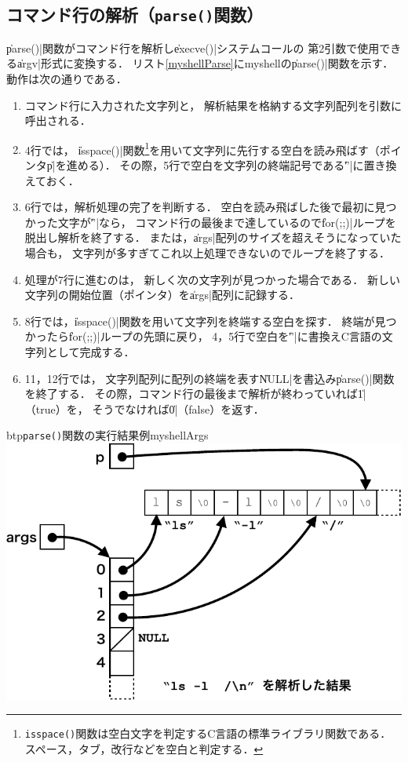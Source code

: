 \subsection{コマンド行の解析（\texttt{parse()}関数）}
\|parse()|関数がコマンド行を解析し\|execve()|システムコールの
第2引数で使用できる\|argv|形式に変換する．
リスト\ref{myshellParse}にmyshellの\|parse()|関数を示す．
動作は次の通りである．



\begin{enumerate}
\item コマンド行に入力された文字列と，
  解析結果を格納する文字列配列を引数に呼出される．
\item 4行では，
  \|isspace()|関数\footnote{
    \texttt{isspace()}関数は空白文字を判定するC言語の標準ライブラリ関数である．
    スペース，タブ，改行などを空白と判定する．
  }を用いて文字列に先行する空白を読み飛ばす（ポインタ\|p|を進める）．
  その際，5行で空白を文字列の終端記号である\|'\0'|に置き換えておく．
\item 6行では，解析処理の完了を判断する．
  空白を読み飛ばした後で最初に見つかった文字が\|'\0'|なら，
  コマンド行の最後まで達しているので\|for(;;)|ループを脱出し解析を終了する．
  または，\|args|配列のサイズを超えそうになっていた場合も，
  文字列が多すぎてこれ以上処理できないのでループを終了する．
\item 処理が7行に進むのは，
  新しく次の文字列が見つかった場合である．
  新しい文字列の開始位置（ポインタ）を\|args|配列に記録する．
\item 8行では，\|isspace()|関数を用いて文字列を終端する空白を探す．
  終端が見つかったら\|for(;;)|ループの先頭に戻り，
  4，5行で空白を\|'\0'|に書換えC言語の文字列として完成する．
\item 11，12行では，
  文字列配列に配列の終端を表す\|NULL|を書込み\|parse()|関数を終了する．
  その際，コマンド行の最後まで解析が終わっていれば\|1|（true）を，
  そうでなければ\|0|（false）を返す．
\end{enumerate}

\begin{myfig}{btp}{\texttt{parse()}関数の実行結果例}{myshellArgs}
  \includegraphics[scale=0.8]{Fig/myshellArgs-crop.pdf}
\end{myfig}

